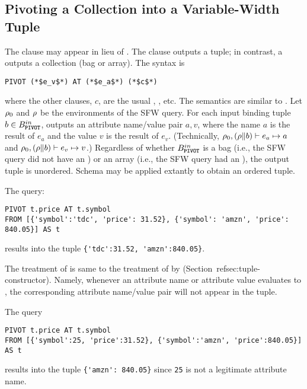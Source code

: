 \subsection{Pivoting a Collection into a Variable-Width Tuple}
\label{sec:pivot}
The  clause may appear in lieu of . The
 clause outputs a tuple; in contrast, a 
outputs a collection (bag or array). The syntax is

\begin{lstlisting}
PIVOT (*$e_v$*) AT (*$e_a$*) (*$c$*)
\end{lstlisting}

\noindent where the other clauses, $c$, are the usual , ,
etc. The semantics are similar to . Let $\rho_{0}$ and $\rho$ be the
environments of the SFW query. For each input binding tuple $b \in
B^{in}_{\texttt{\textbf{PIVOT}}}$,  outputs an attribute name/value pair $a, v$,
where the name $a$ is the result of $e_a$ and the value $v$ is the result of
$e_v$. (Technically, $\rho_{0}, (\rho \| b) \vdash e_a \mapsto a$ and $\rho_{0}, (\rho \|
b) \vdash e_v \mapsto v$.) Regardless of whether $B^{in}_{\texttt{\textbf{PIVOT}}}$ is a bag
(i.e., the SFW query did not have an ) or an array (i.e., the SFW
query had an ), the output tuple is unordered. Schema may be
applied extantly to obtain an ordered tuple.

\begin{example}
The query:

\begin{lstlisting}
PIVOT t.price AT t.symbol
FROM [{'symbol':'tdc', 'price': 31.52}, {'symbol': 'amzn', 'price': 840.05}] AS t
\end{lstlisting}

\noindent results into the tuple \lstinline|{'tdc':31.52, 'amzn':840.05}|.
\end{example}

The treatment of \MISSING is same to the treatment of \MISSING by \select
{} (Section~ref{{sec:tuple-constructor}}). Namely, whenever an attribute
name or attribute value evaluates to \MISSING, the corresponding attribute
name/value pair will not appear in the tuple.

\begin{example}
The query

\begin{lstlisting}
PIVOT t.price AT t.symbol
FROM [{'symbol':25, 'price':31.52}, {'symbol':'amzn', 'price':840.05}] AS t
\end{lstlisting}

\noindent results into the tuple \lstinline|{'amzn': 840.05}| since
\lstinline|25| is not a legitimate attribute name.
\end{example}

